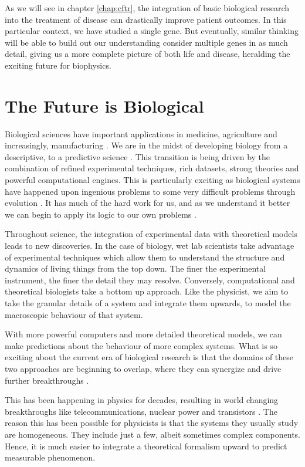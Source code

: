 As we will see in chapter \ref{chap:cftr}, the integration of basic biological research into the treatment of disease can drastically improve patient outcomes. In this particular context, we have studied a single gene. But eventually, similar thinking will be able to build out our understanding consider multiple genes in as much detail, giving us a more complete picture of both life and disease, heralding the exciting future for biophysics. 

\section{The Future is Biological}
Biological sciences have important applications in medicine, agriculture and increasingly, manufacturing \cite{anonymous2019, scown2022}. We are in the midst of developing biology from a descriptive, to a predictive science \cite{kochanski1973,liu2005, mogilner2016, covert2021, jumper2021}. This transition is being driven by the combination of refined experimental techniques, rich datasets, strong theories and powerful computational engines. This is particularly exciting as biological systems have happened upon ingenious problems to some very difficult problems through evolution \cite{dawkins1989}. It has much of the hard work for us, and as we understand it better we can begin to apply its logic to our own problems \cite{benyus2009, wang2021a}.

Throughout science, the integration of experimental data with theoretical models leads to new discoveries. In the case of biology, wet lab scientists take advantage of experimental techniques which allow them to understand the structure and dynamics of living things from the top down. The finer the experimental instrument, the finer the detail they may resolve. Conversely, computational and theoretical biologists take a bottom up approach. Like the physicist, we aim to take the granular details of a system and integrate them upwards, to model the macroscopic behaviour of that system. 

With more powerful computers and more detailed theoretical models, we can make predictions about the behaviour of more complex systems. What is so exciting about the current era of biological research is that the domains of these two approaches are beginning to overlap, where they can synergize  and drive further breakthroughs \cite{anonymous2019}.

This has been happening in physics for decades, resulting in world changing breakthroughs like telecommunications, nuclear power and transistors \cite{wu2009}. The reason this has been possible for physicists is that the systems they usually study are homogeneous. They include just a few, albeit sometimes complex components. Hence, it is much easier to integrate a theoretical formalism upward to predict measurable phenomenon. 

